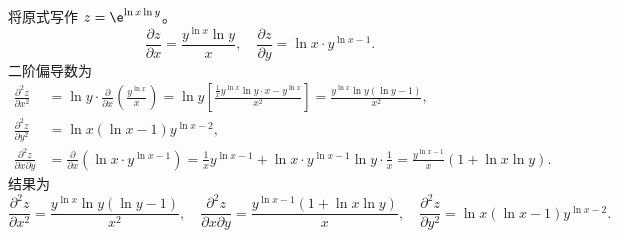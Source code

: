 \begin{solution}
    将原式写作 $z = \e^{\ln x \ln y}$。
    \begin{equation}
        \frac{\partial z}{\partial x} = \frac{y^{\ln x} \ln y}{x}, \quad \frac{\partial z}{\partial y} = \ln x \cdot y^{\ln x - 1}.
    \end{equation}
    二阶偏导数为
    \begin{equation}
        \begin{aligned}
            \frac{\partial^{2} z}{\partial x^{2}}        & = \ln y \cdot \frac{\partial}{\partial x} \left( \frac{y^{\ln x}}{x} \right) = \ln y \left[ \frac{\frac{1}{x} y^{\ln x} \ln y \cdot x - y^{\ln x}}{x^{2}} \right] = \frac{y^{\ln x} \ln y (\ln y - 1)}{x^{2}}, \\
            \frac{\partial^{2} z}{\partial y^{2}}        & = \ln x (\ln x - 1) y^{\ln x - 2},                                                                                                                                                                             \\
            \frac{\partial^{2} z}{\partial x \partial y} & = \frac{\partial}{\partial x} (\ln x \cdot y^{\ln x - 1}) = \frac{1}{x} y^{\ln x - 1} + \ln x \cdot y^{\ln x - 1} \ln y \cdot \frac{1}{x} = \frac{y^{\ln x - 1}}{x} (1 + \ln x \ln y).
        \end{aligned}
    \end{equation}
    结果为
    \begin{equation}
        \boxed{\frac{\partial^{2} z}{\partial x^{2}} = \frac{y^{\ln x} \ln y (\ln y - 1)}{x^{2}}, \quad \frac{\partial^{2} z}{\partial x \partial y} = \frac{y^{\ln x - 1}(1 + \ln x \ln y)}{x}, \quad \frac{\partial^{2} z}{\partial y^{2}} = \ln x (\ln x - 1) y^{\ln x - 2}.}
    \end{equation}


\end{solution}
